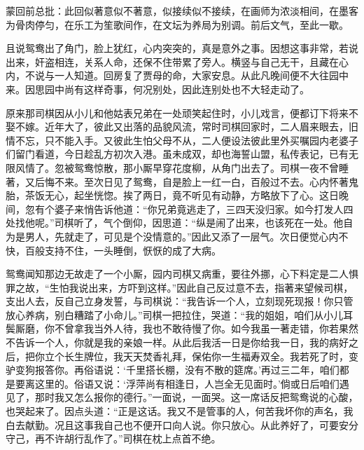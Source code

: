 \begin{parag}

    \begin{note}蒙回前总批：此回似著意似不著意，似接续似不接续，在画师为浓淡相间，在墨客为骨肉停匀，在乐工为笙歌间作，在文坛为养局为别调。前后文气，至此一歇。\end{note}
\end{parag}

\begin{parag}

    且说鸳鸯出了角门，脸上犹红，心内突突的，真是意外之事。因想这事非常，若说出来，奸盗相连，关系人命，还保不住带累了旁人。横竖与自己无干，且藏在心内，不说与一人知道。回房复了贾母的命，大家安息。从此凡晚间便不大往园中来。因思园中尚有这样奇事，何况别处，因此连别处也不大轻走动了。
\end{parag}


\begin{parag}


    原来那司棋因从小儿和他姑表兄弟在一处顽笑起住时，小儿戏言，便都订下将来不娶不嫁。近年大了，彼此又出落的品貌风流，常时司棋回家时，二人眉来眼去，旧情不忘，只不能入手。又彼此生怕父母不从，二人便设法彼此里外买嘱园内老婆子们留门看道，今日趁乱方初次入港。虽未成双，却也海誓山盟，私传表记，已有无限风情了。忽被鸳鸯惊散，那小厮早穿花度柳，从角门出去了。司棋一夜不曾睡著，又后悔不来。至次日见了鸳鸯，自是脸上一红一白，百般过不去。心内怀著鬼胎，茶饭无心，起坐恍惚。挨了两日，竟不听见有动静，方略放下了心。这日晚间，忽有个婆子来悄告诉他道：“你兄弟竟逃走了，三四天没归家。如今打发人四处找他呢。”司棋听了，气个倒仰，因思道：“纵是闹了出来，也该死在一处。他自为是男人，先就走了，可见是个没情意的。”因此又添了一层气。次日便觉心内不快，百般支持不住，一头睡倒，恹恹的成了大病。
\end{parag}


\begin{parag}


    鸳鸯闻知那边无故走了一个小厮，园内司棋又病重，要往外挪，心下料定是二人惧罪之故，“生怕我说出来，方吓到这样。”因此自己反过意不去，指著来望候司棋，支出人去，反自己立身发誓，与司棋说：“我告诉一个人，立刻现死现报！你只管放心养病，别白糟踏了小命儿。”司棋一把拉住，哭道：“我的姐姐，咱们从小儿耳鬓厮磨，你不曾拿我当外人待，我也不敢待慢了你。如今我虽一著走错，你若果然不告诉一个人，你就是我的亲娘一样。从此后我活一日是你给我一日，我的病好之后，把你立个长生牌位，我天天焚香礼拜，保佑你一生福寿双全。我若死了时，变驴变狗报答你。再俗语说：‘千里搭长棚，没有不散的筵席。’再过三二年，咱们都是要离这里的。俗语又说：‘浮萍尚有相逢日，人岂全无见面时。’倘或日后咱们遇见了，那时我又怎么报你的德行。”一面说，一面哭。这一席话反把鸳鸯说的心酸，也哭起来了。因点头道：“正是这话。我又不是管事的人，何苦我坏你的声名，我白去献勤。况且这事我自己也不便开口向人说。你只放心。从此养好了，可要安分守己，再不许胡行乱作了。”司棋在枕上点首不绝。
\end{parag}


